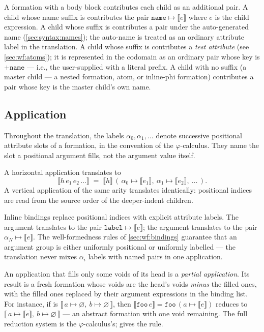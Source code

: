A formation with a body block contributes each child as an additional
  pair.
A child whose name suffix is  contributes the pair
  \(\mathtt{name} \mapsto \llbracket e \rrbracket\) where \(e\) is the
  child expression.
A child whose suffix is \ff{>>} contributes a pair under the
  auto-generated name (\cref{sec:syntax:names});
  the auto-name is treated as an ordinary attribute label in the
  translation.
A child whose suffix is  contributes a \emph{test attribute}
  (see \cref{sec:wf:atoms}); it is represented in the codomain as an
  ordinary pair whose key is \(\mathtt{+name}\)
  --- i.e., the user-supplied  with a literal \ff{+} prefix.
A child with no suffix (a master child --- a nested formation, atom, or
  inline-phi formation) contributes a pair whose key is the master child's
  own name.

\subsection{Application}\label{sec:sem:application}

Throughout the translation, the labels
  \(\alpha_0, \alpha_1, \ldots\)
  denote successive positional attribute slots of a formation, in the
  convention of the \(\varphi\)-calculus.
They name the slot a positional argument fills, not the argument value
  itself.

A horizontal application  translates to
\begin{equation*}
  \llbracket h\,e_1\,e_2\,\ldots \rrbracket\;=\;
    \llbracket h \rrbracket\,
    (\,
      \alpha_0 \mapsto \llbracket e_1 \rrbracket,\
      \alpha_1 \mapsto \llbracket e_2 \rrbracket,\
      \ldots
    \,).
\end{equation*}
A vertical application of the same arity translates identically:
  positional indices are read from the source order of the deeper-indent
  children.

Inline bindings replace positional indices with explicit attribute
  labels.
The argument \ff{e:label} translates to the pair
  \(\mathtt{label} \mapsto \llbracket e \rrbracket\);
  the argument \ff{e:N} translates to the pair
  \(\alpha_N \mapsto \llbracket e \rrbracket\).
The well-formedness rules of \cref{sec:wf:bindings} guarantee that an
  argument group is either uniformly positional or uniformly labelled
  --- the translation never mixes \(\alpha_i\) labels with named pairs in
  one application.

An application that fills only some voids of its head is a \emph{partial
  application}.
Its result is a fresh formation whose voids are the head's voids
  \emph{minus} the filled ones, with the filled ones replaced by their
  argument expressions in the binding list.
For instance, if \ff{foo} is \(\llbracket\,a \mapsto \varnothing,\ b \mapsto \varnothing\,\rrbracket\),
  then
  \(\llbracket \mathtt{foo}\,e \rrbracket = \mathtt{foo}\,(a \mapsto \llbracket e \rrbracket)\)
  reduces to
  \(\llbracket\,a \mapsto \llbracket e \rrbracket,\ b \mapsto \varnothing\,\rrbracket\) ---
  an abstract formation with one void remaining.
The full reduction system is the \(\varphi\)-calculus's;
  \citet{bugayenko2021eolang} gives the rule.

